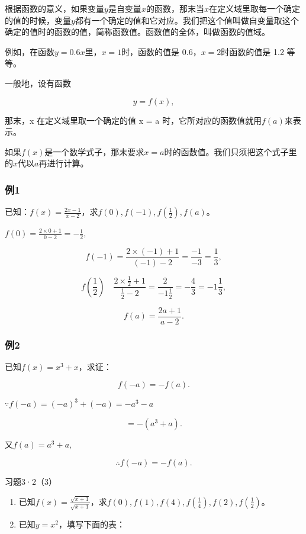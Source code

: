 根据函数的意义，如果变量\(y\)是自变量\(x\)的函数，那末当\(x\)在定义域里取每一个确定的值的时候，变量\(y\)都有一个确定的值和它对应。我们把这个值叫做自变量取这个确定的值时的函数的值，简称函数值。函数值的全体，叫做函数的值域。

例如，在函数\(y = 0.6x\)里，\(x = 1\)时，函数的值是
0.6，\(x = 2\)时函数的值是 1.2 等等。

一般地，设有函数

\[
y = f (x),
\]

那末，x 在定义域里取一个确定的值 x = a
时，它所对应的函数值就用\(f(a)\)来表示。

如果\(f(x)\)是一个数学式子，那末要求\(x = a\)时的函数值。我们只须把这个式子里的\(x\)代以\(a\)再进行计算。

\subsubsection{例1}

已知：\(f(x) = \frac{2x - 1}{x - 2}\)，求\(f(0), f(-1), f\left(\frac{1}{2}\right), f(a)\)。

 \(f(0) = \frac{2\times 0 + 1}{0 - 2} = -\frac{1}{2},\)

\[
f (- 1) = \frac{2 \times (- 1) + 1}{(- 1) - 2} = \frac{- 1}{- 3} = \frac{1}{3},
\]

\[
f \left(\frac{1}{2}\right) \quad \frac{2 \times \frac{1}{2} + 1}{\frac{1}{2} - 2} = \frac{2}{- 1 \frac{1}{2}} = - \frac{4}{3} = - 1 \frac{1}{3},
\]

\[
f (a) = \frac{2 a + 1}{a - 2}.
\]

\subsubsection{例2}

已知\(f(x) = x^3 + x\)，求证：

\[
f (- a) = - f (a).
\]

 \(\because f(-a) = (-a)^{3} + (-a) = -a^{3} - a\)

\[
= - (a^{3} + a).
\]

又\(f(a) = a^{3} + a,\)

\[
\therefore f (- a) = - f (a).
\]

习题3·2（3）

\begin{enumerate}
\item
  已知\(f(x) = \frac{\sqrt{x + 1}}{\sqrt{x + 1}}\)，求\(f(0), f(1), f(4), f\left(\frac{1}{4}\right), f(2), f\left(\frac{1}{2}\right)\)。
\item
  已知\(y = x^2\)，填写下面的表：
\end{enumerate}


